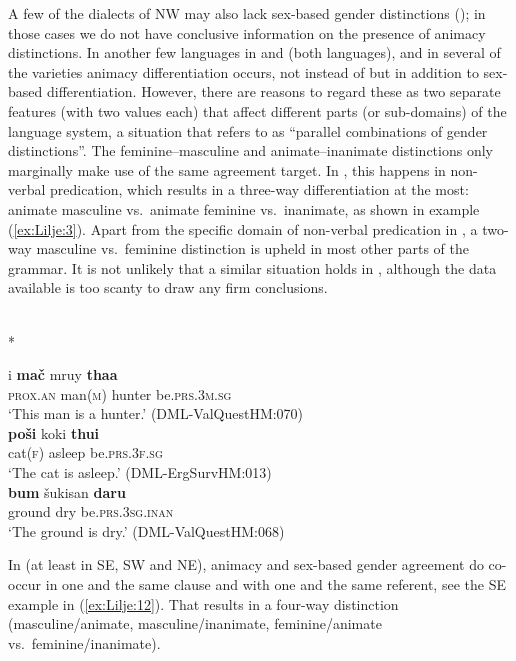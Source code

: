 \documentclass[output=collectionpaper]{langsci/langscibook}
\begin{document}
A few of the dialects of NW  may also lack sex-based gender distinctions (\citealt[150--151]{Morgenstierne1967}); in those cases we do not have conclusive information on the presence of animacy distinctions. In another few languages \textendash{} in  and  (both  languages), and in several of the  varieties \textendash{} animacy differentiation occurs, not instead of but in addition to sex-based differentiation. However, there are reasons to regard these as two separate features (with two values each) that affect different parts (or sub-domains) of the language system, a situation that \citet[581--582]{Dahl2000} refers to as ``parallel combinations of gender distinctions''. The feminine--masculine and animate--inanimate distinctions only marginally make use of the same agreement target. In , this happens in non-verbal predication, which results in a three-way differentiation at the most: animate masculine vs.\ animate feminine vs.\ inanimate, as shown in example (\ref{ex:Lilje:3}). Apart from the specific domain of non-verbal predication in , a two-way masculine vs.\ feminine distinction is upheld in most other parts of the grammar. It is not unlikely that a similar situation holds in , although the data available is too scanty to draw any firm conclusions.

\ea
\label{ex:Lilje:3}
\\*
\begin{xlist}
\ex
\gll i \textbf{mač} mruy \textbf{thaa}\\
\textsc{prox.an} man(\textsc{m}) hunter be\textsc{.prs.3m.sg}    \\
\glt `This man is a hunter.' (DML-ValQuestHM:070)\\
\ex
\gll \textbf{poši} koki \textbf{thui}\\
cat(\textsc{f}) asleep be.\textsc{prs.3f.sg}     \\
\glt `The cat is asleep.' (DML-ErgSurvHM:013)\\
\ex
\gll \textbf{bum} šukisan \textbf{daru}\\
ground dry be.\textsc{prs.3sg.inan}     \\
\glt `The ground is dry.' (DML-ValQuestHM:068)\\
\end{xlist}
\z

In  (at least in SE, SW and NE), animacy and sex-based gender agreement do co-occur in one and the same clause and with one and the same referent, see the SE  example in (\ref{ex:Lilje:12}). That results in a four-way distinction (masculine/animate, masculine/inanimate, feminine/animate vs.\ feminine/inanimate).
\end{document}
